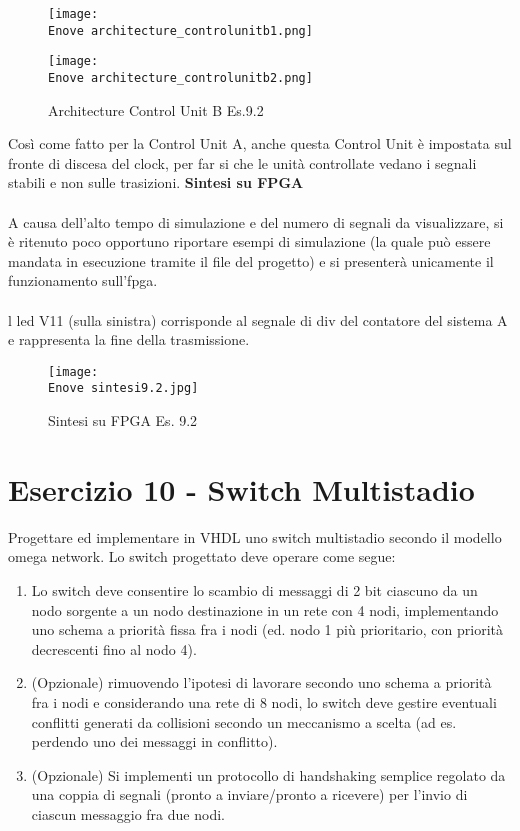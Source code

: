 \documentclass[12pt]{article}
\def \Enove {Allegati/Esercizio9/}
\begin{document}
\clearpage
\begin{figure}[ht!]
    \texttt{[image: \\Enove architecture\_controlunitb1.png]}
\end{figure}
\begin{figure}[ht!]
    \texttt{[image: \\Enove architecture\_controlunitb2.png]}
    \caption{Architecture Control Unit B Es.9.2}
\end{figure}
Così come fatto per la Control Unit A, anche questa Control Unit è impostata sul fronte di discesa del clock, per far si che le unità controllate vedano i segnali stabili e non sulle trasizioni.
\clearpage
{\large \textbf{Sintesi su FPGA}}
\\\\A causa dell’alto tempo di simulazione e del numero di segnali da visualizzare, si è ritenuto poco opportuno riportare esempi di simulazione (la quale può essere mandata in esecuzione tramite il file del progetto) e si presenterà unicamente il funzionamento sull’fpga.
\\\\l led V11 (sulla sinistra) corrisponde al segnale di div del contatore del sistema A e rappresenta la fine della trasmissione.
\begin{figure}[ht!]
    \centering
    \texttt{[image: \\Enove sintesi9.2.jpg]}
    \caption{Sintesi su FPGA Es. 9.2}
\end{figure}
\clearpage
\section{Esercizio 10 - Switch Multistadio}
Progettare ed implementare in VHDL uno switch multistadio secondo il modello omega network. Lo switch progettato deve operare come segue: 
\begin{enumerate}[label=\alph*.]
    \item Lo switch deve consentire lo scambio di messaggi di 2 bit ciascuno da un nodo sorgente a un nodo destinazione in un rete con 4 nodi, implementando uno schema a priorità fissa fra i nodi (ed. nodo 1 più prioritario, con priorità decrescenti fino al nodo 4).
    \item (Opzionale) rimuovendo l’ipotesi di lavorare secondo uno schema a priorità fra i nodi e considerando una rete di 8 nodi, lo switch deve gestire eventuali conflitti generati da collisioni secondo un meccanismo a scelta (ad es. perdendo uno dei messaggi in conflitto).
    \item (Opzionale) Si implementi un protocollo di handshaking semplice regolato da una coppia di segnali (pronto a inviare/pronto a ricevere) per l’invio di ciascun messaggio fra due nodi.
\end{enumerate}
\end{document}
